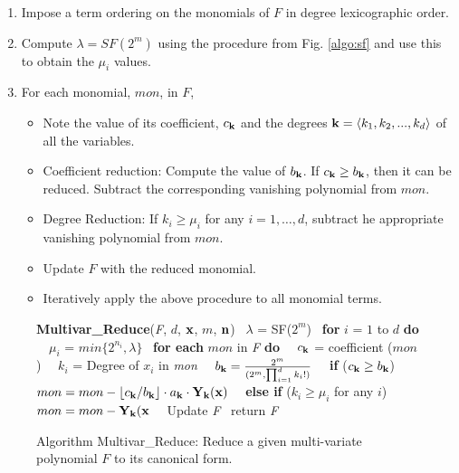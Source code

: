 \begin{enumerate}
\item  Impose a term ordering on the  monomials of $F$ in
 degree lexicographic order.  
\item Compute $\lambda = SF(2^m)$ using the procedure from
Fig. \ref{algo:sf} and use this to obtain the $\mu_i$
values.
\item For each monomial, $mon$, in $F$,
\begin{itemize}
\item Note the value of its coefficient, $c_{\bf k}$ and the degrees
  ${\bf k} = \langle k_1,k_2,...,k_d \rangle$ of all the variables.
\item Coefficient reduction: Compute the value of $b_{\bf k}$. If $c_{\bf k} \geq
b_\textbf{k}$, then it can be reduced. Subtract the corresponding
vanishing polynomial from $mon$.
\item Degree Reduction: If $k_i \geq \mu_i$ for any $i = 1, \ldots, d$,
subtract he appropriate vanishing polynomial from $mon$.
\item Update $F$ with the reduced monomial.
\item Iteratively apply the above procedure to all monomial terms.
\end{itemize}
\end{enumerate}

\begin{figure}[ht]
  \begin{algorithm}
    \small{\bf{Multivar\_Reduce}}(\emph{F}, $d$, ${\bf x}$, $m$, ${\bf n}$)
    \  $\lambda$ = SF($2^m$)
    \ {\bf{for}} $i$ = $1$ to $d$ {\bf{do}}
    \ \ $\mu_i$ = $min\{2^{n_i}, \lambda\}$
    \ {\bf{for each}} $mon$ in \emph{F} {\bf{do}}  
    \ \ $c_{\bf k}$ = coefficient ($mon$)
    \ \ $k_i$ = Degree of $x_i$ in \emph{mon}
    \ \ $b_{\bf k} = {{2^m}\over{(2^m,\prod_{i=1}^d{k_i!}})}$ 
    \ \ {\bf{if}} ($c_{\bf k} \geq b_{\bf k}$) 
    \ \ \ $mon = mon - \lfloor{c_{\bf k}/b_{\bf k}}\rfloor \cdot a_{\bf k}\cdot {\bf Y}_{\bf k}({\bf x})$ 
    \ \ {\bf{else if}} ($k_i \geq \mu_i$ for any $i$)
    \ \ \ $mon = mon -{\bf Y}_{\bf k}({\bf x}$ 
    \ \ Update \emph{F}
    \ return \emph{F}
  \end{algorithm}
  \caption{\label{algo:can_redmulti} Algorithm Multivar\_Reduce: Reduce
  a given multi-variate polynomial $F$ to its canonical form.}
\end{figure}

